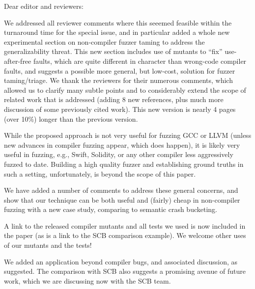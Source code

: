 \documentclass{letter}
\begin{document}
\begin{letter}{}

  \address{Alex Groce\\School of Informatics, Computing \& Cyber Systems\\Northern Arizona University}

  \opening{Dear editor and reviewers:}

We addressed all reviewer comments where this seeemed feasible within the turnaround time for the special issue, and in particular added a whole new experimental section on non-compiler fuzzer taming to address the generalizability threat.  This new section includes use of mutants to ``fix'' use-after-free faults, which are quite different in character than wrong-code compiler faults, and suggests a possible more general, but low-cost, solution for fuzzer taming/triage.  We thank the reviewers for their numerous comments, which allowed us to clarify many subtle points and to considerably extend the scope of related work that is addressed (adding 8 new references, plus much more discussion of some previously cited work).  This new version is nearly 4 pages (over 10\%) longer than the previous version.
  

  While the proposed approach is not very useful for fuzzing GCC or LLVM (unless new advances in compiler fuzzing appear, which does happen), it is likely very useful in fuzzing, e.g., Swift, Solidity, or any other compiler less aggressively fuzzed to date.  Building a high quality fuzzer and establishing ground truths in such a setting, unfortunately, is beyond the scope of this paper.

  We have added a number of comments to address these general concerns, and show that our technique can be both useful and (fairly) cheap in non-compiler fuzzing with a new case study, comparing to semantic crash bucketing.

  A link to the released compiler mutants and all tests we used is now included in the paper (as is a link to the SCB comparison example).  We welcome other uses of our mutants and the tests!


We added an application beyond compiler bugs, and associated discussion, as suggested.  The comparison with SCB also suggests a promising avenue of future work, which we are discussing now with the SCB team.


\end{letter}
\end{document}
